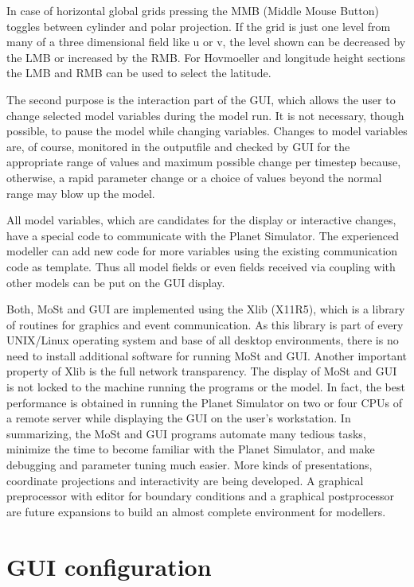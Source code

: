 In case of horizontal global grids pressing the MMB (Middle Mouse Button)
toggles between cylinder and polar projection. If the grid is
just one level from many of a three dimensional field like u or v,
the level shown can be decreased by the LMB or increased by the RMB.
For Hovmoeller and longitude height sections the LMB and RMB can
be used to select the latitude.

The second purpose is the interaction part of the GUI, which allows the user to change
selected model variables during the model run.
It is not necessary, though possible, to pause the
model while changing variables. Changes to model variables
are, of course, monitored in the outputfile and checked
by GUI for the appropriate range of values and
maximum possible change per timestep because, 
otherwise, a rapid parameter change or a choice of values beyond the normal
range may blow up the model.

All model variables, which are candidates for the display
or interactive changes, have a special code to communicate
with the Planet Simulator. The experienced modeller
can add new code for more variables using the existing
communication code as template. Thus all model fields
or even fields received via coupling with other models
can be put on the GUI display.

Both, MoSt and GUI are implemented using the Xlib (X11R5),
which is a library of routines for graphics and event communication.
As this library is part of every UNIX/Linux operating system
and base of all desktop environments, there is no need
to install additional software for running MoSt and GUI.
Another important  property of Xlib is the full network transparency.
The display of MoSt and GUI is not locked to the machine
running the programs or the model. In fact, the best
performance is obtained in running the Planet Simulator on
two or four CPUs of a remote server while displaying
the GUI on the user's workstation.
In summarizing, the MoSt and GUI programs automate many tedious tasks,
minimize the time to become familiar with the Planet Simulator,
and make debugging and parameter tuning much easier.
More kinds of presentations, coordinate projections
and interactivity are being developed.
A graphical preprocessor with editor for boundary
conditions and a graphical postprocessor are future expansions
to build an almost complete environment for modellers.

\section{GUI configuration}

